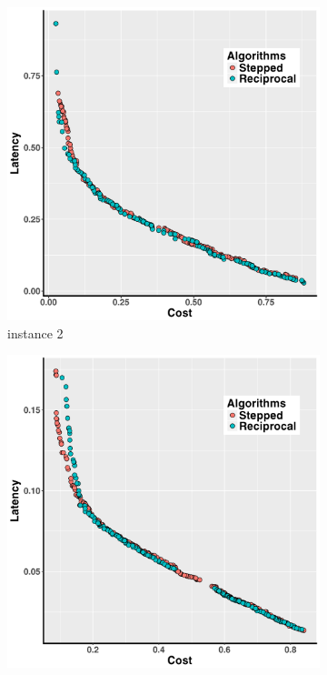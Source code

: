 \documentclass[10pt,journal,compsoc]{IEEEtran}
\begin{document}
\begin{figure}[h!]
   \centering
   \begin{subfigure}{0.49\linewidth}
       \includegraphics[width=\textwidth]{pics/transfer_problem2.png}
    \caption{instance 2}
   \end{subfigure}
   \begin{subfigure}{0.49\linewidth}
       \includegraphics[width=\textwidth]{pics/transfer_problem3.png}

\end{subfigure}
\end{figure}
\end{document}
